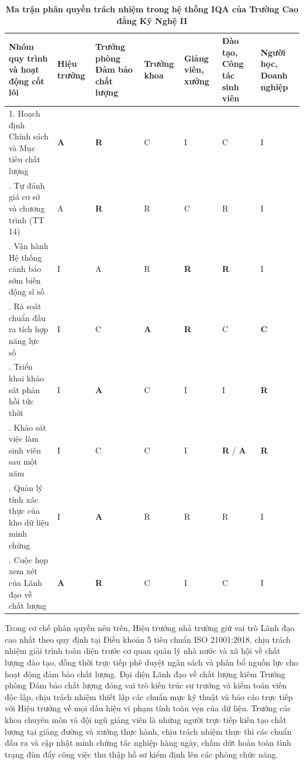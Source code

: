 \begin{table}[htbp]
\centering
\footnotesize
\setlength{\tabcolsep}{3pt}
\caption{\textbf{Ma trận phân quyền trách nhiệm trong hệ thống IQA của Trường Cao đẳng Kỹ Nghệ II}}
\vspace{0.2cm}
\begin{tabularx}{\textwidth}{X C{1.3cm} C{2.2cm} C{1.3cm} C{1.8cm} C{2.2cm} C{1.8cm}}
\toprule
\textbf{Nhóm quy trình và hoạt động cốt lõi} & \textbf{Hiệu trưởng} & \textbf{Trưởng phòng Đảm bảo chất lượng} & \textbf{Trưởng khoa} & \textbf{Giảng viên, xưởng} & \textbf{Đào tạo, Công tác sinh viên} & \textbf{Người học, Doanh nghiệp} \\
. Hoạch định Chính sách và Mục tiêu chất lượng & \textbf{A} & \textbf{R} & C & I & C & I \\
. Tự đánh giá cơ sở và chương trình (TT 14) & A & \textbf{R} & R & C & R & I \\
. Vận hành Hệ thống cảnh báo sớm biến động sĩ số & I & A & R & \textbf{R} & \textbf{R} & I \\
. Rà soát chuẩn đầu ra tích hợp năng lực số & I & C & \textbf{A} & \textbf{R} & C & \textbf{C} \\
. Triển khai khảo sát phản hồi tức thời & I & \textbf{A} & C & I & I & \textbf{R} \\
. Khảo sát việc làm sinh viên sau một năm & I & C & C & I & \textbf{R} / \textbf{A} & \textbf{R} \\
. Quản lý tính xác thực của kho dữ liệu minh chứng & I & \textbf{A} & R & R & R & I \\
. Cuộc họp xem xét của Lãnh đạo về chất lượng & \textbf{A} & \textbf{R} & C & I & C & I \\
\bottomrule
\end{tabularx}
\end{table}

Trong cơ chế phân quyền nêu trên, Hiệu trưởng nhà trường giữ vai trò Lãnh đạo cao nhất theo quy định tại Điều khoản 5 tiêu chuẩn ISO 21001:2018, chịu trách nhiệm giải trình toàn diện trước cơ quan quản lý nhà nước và xã hội về chất lượng đào tạo, đồng thời trực tiếp phê duyệt ngân sách và phân bổ nguồn lực cho hoạt động đảm bảo chất lượng. Đại diện Lãnh đạo về chất lượng kiêm Trưởng phòng Đảm bảo chất lượng đóng vai trò kiến trúc sư trưởng và kiểm toán viên độc lập, chịu trách nhiệm thiết lập các chuẩn mực kỹ thuật và báo cáo trực tiếp với Hiệu trưởng về mọi dấu hiệu vi phạm tính toàn vẹn của dữ liệu. Trưởng các khoa chuyên môn và đội ngũ giảng viên là những người trực tiếp kiến tạo chất lượng tại giảng đường và xưởng thực hành, chịu trách nhiệm thực thi các chuẩn đầu ra và cập nhật minh chứng tác nghiệp hàng ngày, chấm dứt hoàn toàn tình trạng đùn đẩy công việc thu thập hồ sơ kiểm định lên các phòng chức năng.

